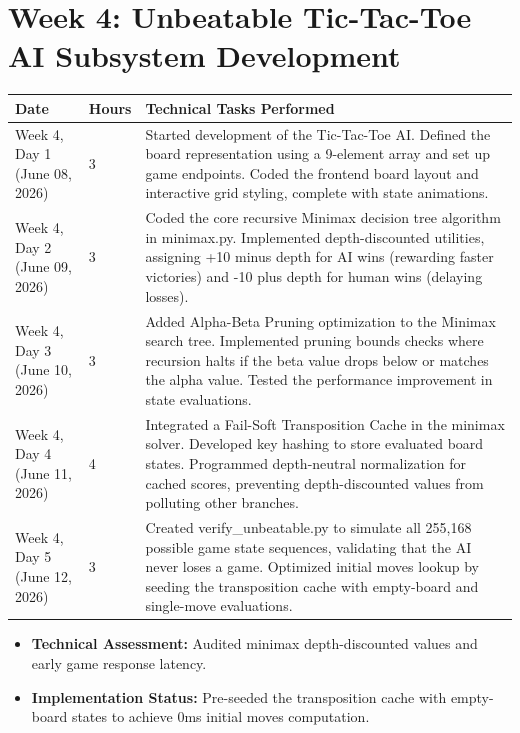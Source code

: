 \documentclass[11pt,a4paper]{article}
\begin{document}
\newpage

\section*{Week 4: Unbeatable Tic-Tac-Toe AI Subsystem Development}
\begin{longtable}{L{2.8cm} C{1.2cm} L{10.5cm}}
    \toprule
    \textbf{Date} & \textbf{Hours} & \textbf{Technical Tasks Performed} \\
    \midrule
    \endhead
    \bottomrule
    \endfoot
    \bottomrule
    \endlastfoot
    Week 4, Day 1 \newline (June 08, 2026) & 3 & Started development of the Tic-Tac-Toe AI. Defined the board representation using a 9-element array and set up game endpoints. Coded the frontend board layout and interactive grid styling, complete with state animations. \\
    \addlinespace
    Week 4, Day 2 \newline (June 09, 2026) & 3 & Coded the core recursive Minimax decision tree algorithm in minimax.py. Implemented depth-discounted utilities, assigning +10 minus depth for AI wins (rewarding faster victories) and -10 plus depth for human wins (delaying losses). \\
    \addlinespace
    Week 4, Day 3 \newline (June 10, 2026) & 3 & Added Alpha-Beta Pruning optimization to the Minimax search tree. Implemented pruning bounds checks where recursion halts if the beta value drops below or matches the alpha value. Tested the performance improvement in state evaluations. \\
    \addlinespace
    Week 4, Day 4 \newline (June 11, 2026) & 4 & Integrated a Fail-Soft Transposition Cache in the minimax solver. Developed key hashing to store evaluated board states. Programmed depth-neutral normalization for cached scores, preventing depth-discounted values from polluting other branches. \\
    \addlinespace
    Week 4, Day 5 \newline (June 12, 2026) & 3 & Created verify\_unbeatable.py to simulate all 255,168 possible game state sequences, validating that the AI never loses a game. Optimized initial moves lookup by seeding the transposition cache with empty-board and single-move evaluations. \\
\end{longtable}

\begin{tcolorbox}[colback=gray!5!white,colframe=gray!60!black,title=Weekly Review (Week 4)]
    \begin{itemize}
        \item \textbf{Technical Assessment:} Audited minimax depth-discounted values and early game response latency.
        \item \textbf{Implementation Status:} Pre-seeded the transposition cache with empty-board states to achieve 0ms initial moves computation.
    \end{itemize}
\end{tcolorbox}
\end{document}
